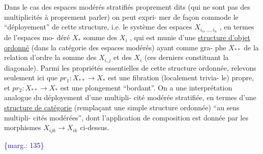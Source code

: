 \documentclass[11pt]{article}
\newcommand{\margin}[1]{\textcolor{blue}{\{\textsf{marg.:} #1\}}}
\newcommand{\uline}[1]{\underline{#1}}
\begin{document}
Dans le cas des espaces modérés stratifiés proprement dits (qui
ne sont pas des multiplicités à proprement parler) on peut expri-%
mer de façon commode le ``déployement'' de cette structure, i.e.
le système des espaces $X_{i_o,\ldots,i_n}$ , en termes de l'espaces mo-%
déré $X_*$ somme des $X_i$ , qui est munie d'une \uline{structure d'objet}
\uline{ordonné} (dans la catégorie des espaces modérés) ayant comme gra-%
phe $X_{**}$ de la relation d'ordre la somme des $X_{i,j}$ et des $X_i$
(ces derniers constituant la diagonale). Parmi les propriétés
essentielles de cette structure ordonnée, relevons seulement
ici que $pr_1 : X_{**} \longrightarrow X_*$ est une fibration (localement trivia-%
le) propre, et $pr_2 : X_{**} \longrightarrow X_*$ est une plongement ``bordant''.
On a une interprétation analogue du déployement d'une multipli-%
cité modérée stratifiée, en termes d'une \uline{structure de catégorie}
(remplaçant une simple structure ordonnée) ``au sens multipli-%
cités modérées'', dont l'application de composition est donnée
par les morphismes $X_{ijk} \longrightarrow X_{ik}$ ci-dessus.

\margin{135}
\end{document}
